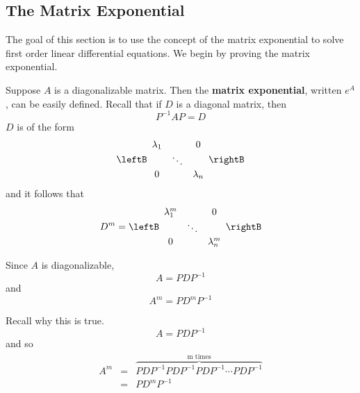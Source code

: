 
\subsection{The Matrix Exponential}

The goal of this section is to use the concept of the matrix exponential to solve first order linear differential equations. We begin by proving the matrix exponential. 

Suppose $A$ is a diagonalizable matrix. Then the {\bf matrix exponential}, written $e^{A}$, can be easily defined. 
Recall that if $D$ is a diagonal matrix, then  
\begin{equation*}
P^{-1}AP=D
\end{equation*}
$D$ is of the form 
\begin{equation}
\leftB 
\begin{array}{ccc}
\lambda _{1} &  & 0 \\ 
& \ddots &  \\ 
0 &  & \lambda _{n}
\end{array}
\rightB  \label{diagonalmatrix}
\end{equation}
and it follows that 
\begin{equation*}
D^{m}=\leftB 
\begin{array}{ccc}
\lambda _{1}^{m} &  & 0 \\ 
& \ddots &  \\ 
0 &  & \lambda _{n}^{m}
\end{array}
\rightB
\end{equation*}

Since $A$ is diagonalizable, 
\begin{equation*}
A=PDP^{-1}
\end{equation*}
and
\begin{equation*}
A^{m}=PD^{m}P^{-1}
\end{equation*}

Recall why this is true. 
\begin{equation*}
A=PDP^{-1}
\end{equation*}
and so 
\begin{eqnarray*}
A^{m} &=&\overset{
\text{m times}}{\overbrace{PDP^{-1}PDP^{-1}PDP^{-1}\cdots PDP^{-1}}} \\
&=&PD^{m}P^{-1}
\end{eqnarray*}

